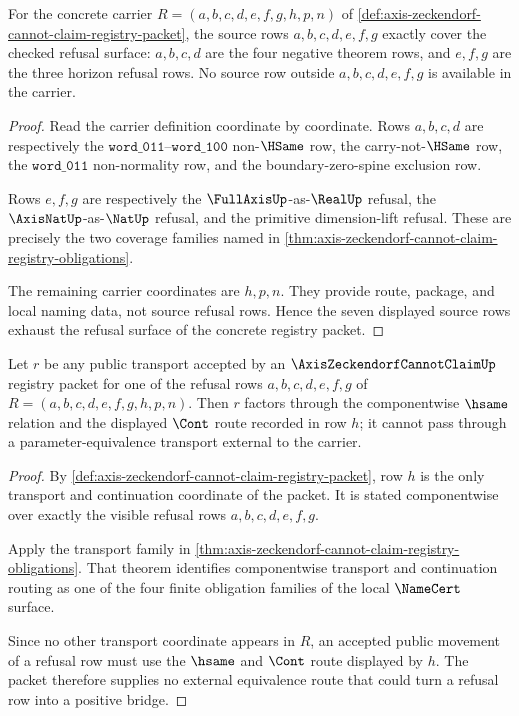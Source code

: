 \begin{theorem}
\label{thm:axis-zeckendorf-cannot-claim-source-row-coverage}
For the concrete carrier $R=(a,b,c,d,e,f,g,h,p,n)$ of \autoref{def:axis-zeckendorf-cannot-claim-registry-packet}, the source rows $a,b,c,d,e,f,g$ exactly cover the checked refusal surface: $a,b,c,d$ are the four negative theorem rows, and $e,f,g$ are the three horizon refusal rows. No source row outside $a,b,c,d,e,f,g$ is available in the carrier.
\end{theorem}
\begin{proof}
Read the carrier definition coordinate by coordinate. Rows $a,b,c,d$ are respectively the $\mathtt{word\_011}$--$\mathtt{word\_100}$ non-$\HSame$ row, the carry-not-$\HSame$ row, the $\mathtt{word\_011}$ non-normality row, and the boundary-zero-spine exclusion row.

Rows $e,f,g$ are respectively the $\FullAxisUp$-as-$\RealUp$ refusal, the $\AxisNatUp$-as-$\NatUp$ refusal, and the primitive dimension-lift refusal. These are precisely the two coverage families named in \autoref{thm:axis-zeckendorf-cannot-claim-registry-obligations}.

The remaining carrier coordinates are $h,p,n$. They provide route, package, and local naming data, not source refusal rows. Hence the seven displayed source rows exhaust the refusal surface of the concrete registry packet.
\end{proof}

\begin{theorem}
\label{thm:axis-zeckendorf-cannot-claim-refusal-transport}
Let $r$ be any public transport accepted by an $\AxisZeckendorfCannotClaimUp$ registry packet for one of the refusal rows $a,b,c,d,e,f,g$ of $R=(a,b,c,d,e,f,g,h,p,n)$. Then $r$ factors through the componentwise $\hsame$ relation and the displayed $\Cont$ route recorded in row $h$; it cannot pass through a parameter-equivalence transport external to the carrier.
\end{theorem}
\begin{proof}
By \autoref{def:axis-zeckendorf-cannot-claim-registry-packet}, row $h$ is the only transport and continuation coordinate of the packet. It is stated componentwise over exactly the visible refusal rows $a,b,c,d,e,f,g$.

Apply the transport family in \autoref{thm:axis-zeckendorf-cannot-claim-registry-obligations}. That theorem identifies componentwise transport and continuation routing as one of the four finite obligation families of the local $\NameCert$ surface.

Since no other transport coordinate appears in $R$, an accepted public movement of a refusal row must use the $\hsame$ and $\Cont$ route displayed by $h$. The packet therefore supplies no external equivalence route that could turn a refusal row into a positive bridge.
\end{proof}

